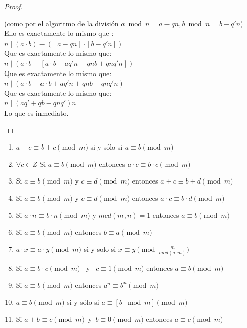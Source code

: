\begin{proof}
\begin{enumerate}[label=\roman*)]
(como por el algoritmo de la división $a \bmod n = a - qn, b \bmod n = b - q'n$) \\
Ello es exactamente lo mismo que :  \\ 
$n \mid (a \cdot b) - ([a - qn] \cdot [b - q'n])$  \\ 
Que es exactamente lo mismo que:  \\ 
$n \mid (a \cdot b - [a \cdot b - aq'n - qnb + qnq'n])$  \\ 
Que es exactamente lo mismo que:  \\ 
$n \mid (a \cdot b - a \cdot b + aq'n + qnb - qnq'n)$  \\ 
Que es exactamente lo mismo que:  \\ 
$n \mid (aq' + qb - qnq')n$  \\ 
Lo que es inmediato.
\end{enumerate}
\end{proof}

\begin{enunciado} \label{enun:propCongru}\leavevmode\par
\begin{enumerate}[label=\roman*)]
\item $a+c \equiv b+c \pmod  m$ si y sólo si $a \equiv b \pmod  m$
\item $\forall c \in Z$ Si $a \equiv b \pmod  m$ entonces $a \cdot c \equiv b \cdot c \pmod  m$
\item Si $a \equiv b \pmod  m$ y $c \equiv d \pmod  m$ entonces $a+c \equiv b+d \pmod  m$
\item Si $a \equiv b \pmod  m$ y $c \equiv d \pmod  m$ entonces $a \cdot c \equiv b \cdot d \pmod  m$
\item Si $a \cdot n \equiv b \cdot n \pmod  m$ y $mcd(m, n)=1$ entonces $a \equiv b \pmod  m$
\item Si $a \equiv b \pmod  m$ entonces $b \equiv a \pmod  m$
\item $a \cdot x \equiv a \cdot y \pmod  m$ si y solo si $x \equiv y \pmod  {\frac{m}{mcd(a,m)}}$
\item Si $a \equiv b \cdot c \pmod  m$ \, y \, $c \equiv 1 \pmod  m$ entonces $a \equiv b \pmod  m$
\item Si $a \equiv b \pmod  m$ entonces $a^{n} \equiv b^{n} \pmod  m$
\item $a \equiv b \pmod  m$ si y sólo si $a \equiv [b \mod m] \pmod m$
\item Si  $a+b \equiv c \pmod m \,$ y $\, b \equiv 0 \pmod m$ entonces $a \equiv c \pmod m$ 
\end{enumerate}
\end{enunciado}

